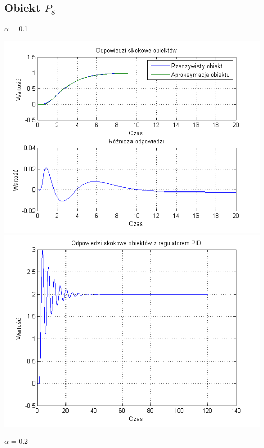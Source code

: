 \documentclass[10pt,a4paper]{article}
\begin{document}
\subsection{Obiekt $P_8$}
$\alpha$ = 0.1
\begin{center}
\includegraphics[scale=1]{images/dwa/skrypt_225.png}\\
\includegraphics[scale=1]{images/dwa/skrypt_226.png}\\
\end{center}
\newpage
$\alpha$ = 0.2
\end{document}
